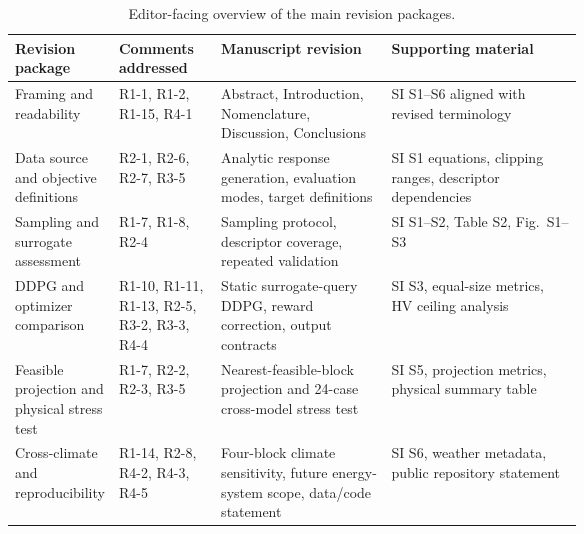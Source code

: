 \documentclass[10pt]{article}
\begin{document}
\begin{table}[H]
\centering
\caption{Editor-facing overview of the main revision packages.}
{\scriptsize
\setlength{\tabcolsep}{2.4pt}
\renewcommand{\arraystretch}{0.94}
\begin{tabularx}{\linewidth}{@{}p{0.18\linewidth}p{0.18\linewidth}p{0.30\linewidth}X@{}}
\toprule
Revision package & Comments addressed & Manuscript revision & Supporting material \\
\midrule
Framing and readability & R1-1, R1-2, R1-15, R4-1 & Abstract, Introduction, Nomenclature, Discussion, Conclusions & SI S1--S6 aligned with revised terminology \\
Data source and objective definitions & R2-1, R2-6, R2-7, R3-5 & Analytic response generation, evaluation modes, target definitions & SI S1 equations, clipping ranges, descriptor dependencies \\
Sampling and surrogate assessment & R1-7, R1-8, R2-4 & Sampling protocol, descriptor coverage, repeated validation & SI S1--S2, Table S2, Fig.~S1--S3 \\
DDPG and optimizer comparison & R1-10, R1-11, R1-13, R2-5, R3-2, R3-3, R4-4 & Static surrogate-query DDPG, reward correction, output contracts & SI S3, equal-size metrics, HV ceiling analysis \\
Feasible projection and physical stress test & R1-7, R2-2, R2-3, R3-5 & Nearest-feasible-block projection and 24-case cross-model stress test & SI S5, projection metrics, physical summary table \\
Cross-climate and reproducibility & R1-14, R2-8, R4-2, R4-3, R4-5 & Four-block climate sensitivity, future energy-system scope, data/code statement & SI S6, weather metadata, public repository statement \\
\bottomrule
\end{tabularx}
}
\end{table}


\end{document}
